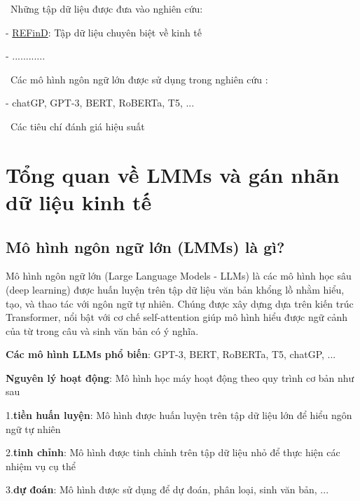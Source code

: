 \documentclass{article} %
\begin{document}
\noindent
\textbullet\ Những tập dữ liệu được đưa vào nghiên cứu: 

\hspace{10pt}- \hyperlink{ref:refind2023}{REFinD}: Tập dữ liệu chuyên biệt về kinh tế

\hspace{10pt}- ............

\noindent
\textbullet\ Các mô hình ngôn ngữ lớn được sử dụng trong nghiên cứu :

\hspace{10pt}- chatGP, GPT-3, BERT, RoBERTa, T5, ...

\noindent
\textbullet\ Các tiêu chí đánh giá hiệu suất

\section{Tổng quan về LMMs và gán nhãn dữ liệu kinh tế}

\subsection{Mô hình ngôn ngữ lớn (LMMs) là gì?}

\hspace{10pt} Mô hình ngôn ngữ lớn (Large Language Models - LLMs) là các mô hình học sâu (deep learning) được huấn luyện trên tập 
dữ liệu văn bản khổng lồ nhằm hiểu, tạo, và thao tác với ngôn ngữ tự nhiên. Chúng được xây dựng dựa trên kiến trúc Transformer, 
nổi bật với cơ chế self-attention giúp mô hình hiểu được ngữ cảnh của từ trong câu và sinh văn bản có ý nghĩa.

\hspace{10pt} \textbf{Các mô hình LLMs phổ biến}: GPT-3, BERT, RoBERTa, T5, chatGP, ...

\hspace{10pt} \textbf{Nguyên lý hoạt động}: Mô hình học máy hoạt động theo quy trình cơ bản như sau

\hspace{35pt} 1.\textbf{tiền huấn luyện}: Mô hình được huấn luyện trên tập dữ liệu lớn để hiểu ngôn ngữ tự nhiên

\hspace{35pt} 2.\textbf{tinh chỉnh}: Mô hình được tinh chỉnh trên tập dữ liệu nhỏ để thực hiện các nhiệm vụ cụ thể

\hspace{35pt} 3.\textbf{dự đoán}: Mô hình được sử dụng để dự đoán, phân loại, sinh văn bản, ...
\end{document}
